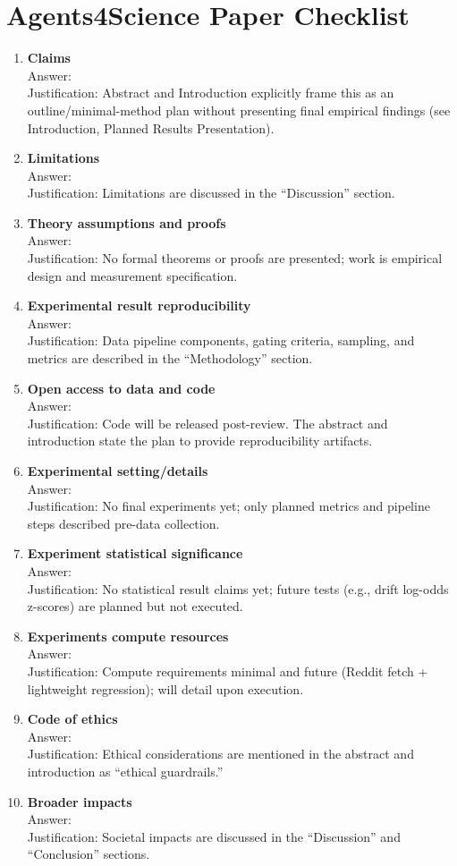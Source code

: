 \documentclass{article}
\begin{document}
\section*{Agents4Science Paper Checklist}
\begin{enumerate}
\item {\bf Claims} \\Answer: \answerYes{} \\Justification: Abstract and Introduction explicitly frame this as an outline/minimal-method plan without presenting final empirical findings (see Introduction, Planned Results Presentation).
\item {\bf Limitations} \\Answer: \answerYes{} \\Justification: Limitations are discussed in the ``Discussion'' section.
\item {\bf Theory assumptions and proofs} \\Answer: \answerNA{} \\Justification: No formal theorems or proofs are presented; work is empirical design and measurement specification.
\item {\bf Experimental result reproducibility} \\Answer: \answerYes{} \\Justification: Data pipeline components, gating criteria, sampling, and metrics are described in the ``Methodology'' section.
\item {\bf Open access to data and code} \\Answer: \answerNo{} \\Justification: Code will be released post-review. The abstract and introduction state the plan to provide reproducibility artifacts.
\item {\bf Experimental setting/details} \\Answer: \answerNA{} \\Justification: No final experiments yet; only planned metrics and pipeline steps described pre-data collection.
\item {\bf Experiment statistical significance} \\Answer: \answerNA{} \\Justification: No statistical result claims yet; future tests (e.g., drift log-odds z-scores) are planned but not executed.
\item {\bf Experiments compute resources} \\Answer: \answerNA{} \\Justification: Compute requirements minimal and future (Reddit fetch + lightweight regression); will detail upon execution.
\item {\bf Code of ethics} \\Answer: \answerYes{} \\Justification: Ethical considerations are mentioned in the abstract and introduction as ``ethical guardrails.''
\item {\bf Broader impacts} \\Answer: \answerYes{} \\Justification: Societal impacts are discussed in the ``Discussion'' and ``Conclusion'' sections.
\end{enumerate}
\end{document}
